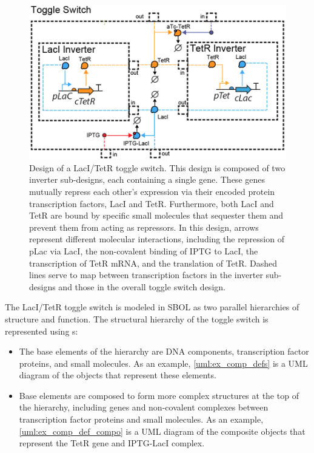 \begin{figure}[ht]
\begin{center}
\includegraphics[width=\textwidth]{images/toggleswitch_modular2}
\caption[]{Design of a LacI/TetR toggle switch. This design is composed of two inverter sub-designs, each containing a single gene. These genes mutually repress each other's expression via their encoded protein transcription factors, LacI and TetR. Furthermore, both LacI and TetR are bound by specific small molecules that sequester them and prevent them from acting as repressors. In this design, arrows represent different molecular interactions, including the repression of pLac via LacI, the non-covalent binding of IPTG to LacI, the transcription of TetR mRNA, and the translation of TetR. Dashed lines serve to map between transcription factors in the inverter sub-designs and those in the overall toggle switch design.}
\label{images:toggleswitch_modular}
\end{center}
\end{figure}


The LacI/TetR toggle switch is modeled in SBOL as two parallel hierarchies of structure and function. The structural hierarchy of the toggle switch is represented using s:
\begin{itemize}
\item The base elements of the hierarchy are DNA components, transcription factor proteins, and small molecules. As an example, \ref{uml:ex_comp_defs} is a UML diagram of the  objects that represent these elements.
\item Base elements are composed to form more complex structures at the top of the hierarchy, including genes and non-covalent complexes between transcription factor proteins and small molecules. As an example, \ref{uml:ex_comp_def_compo} is a UML diagram of the composite  objects that represent the TetR gene and IPTG-LacI complex.
\end{itemize}

